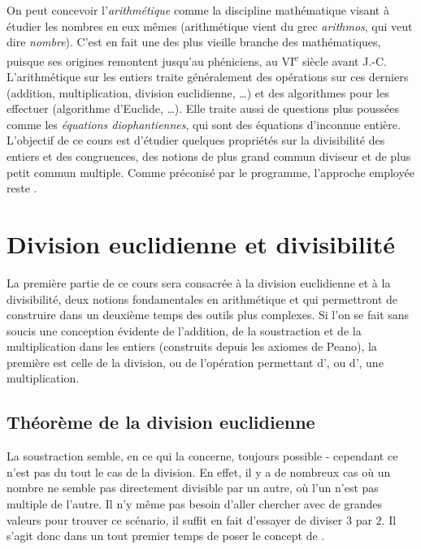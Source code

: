 \documentclass[a4paper,french,bookmarks]{article}
\begin{document}

\qquad On peut concevoir l'\textit{arithmétique} comme la discipline mathématique visant à étudier les nombres en eux mêmes (arithmétique vient du grec \textit{arithmos}, qui veut dire \textit{nombre}). C'est en fait une des plus vieille branche des mathématiques, puisque ses origines remontent jusqu'au phéniciens, au VI\textsuperscript{e} siècle avant J.-C. L'arithmétique sur les entiers traite généralement des opérations sur ces derniers (addition, multiplication, division euclidienne, \dots) et des algorithmes pour les effectuer (algorithme d'Euclide, \dots). Elle traite aussi de questions plus poussées comme les \textit{équations diophantiennes}, qui sont des équations d'inconnue entière.\\

\qquad L’objectif de ce cours est d’étudier quelques propriétés sur la divisibilité des entiers et des congruences, des notions de plus grand commun diviseur et de plus petit commun multiple. Comme préconisé par le programme, l’approche employée reste .\\

\initcours

\section{Division euclidienne et divisibilité}

\qquad La première partie de ce cours sera consacrée à la division euclidienne et à la divisibilité, deux notions fondamentales en arithmétique et qui permettront de construire dans un deuxième temps des outils plus complexes. Si l'on se fait sans soucis une conception évidente de l'addition, de la soustraction et de la multiplication dans les entiers (construits depuis les axiomes de Peano), la première  est celle de la division, ou de l'opération permettant d', ou d', une multiplication.

\subsection{Théorème de la division euclidienne}

La soustraction semble, en ce qui la concerne, toujours possible - cependant ce n'est pas du tout le cas de la division. En effet, il y a de nombreux cas où un nombre ne semble pas directement divisible par un autre, où l'un n'est pas multiple de l'autre. Il n'y même pas besoin d'aller chercher avec de grandes valeurs pour trouver ce scénario, il suffit en fait d'essayer de diviser $3$ par $2$. Il s'agit donc dans un tout premier temps de poser le concept de .
\end{document}
